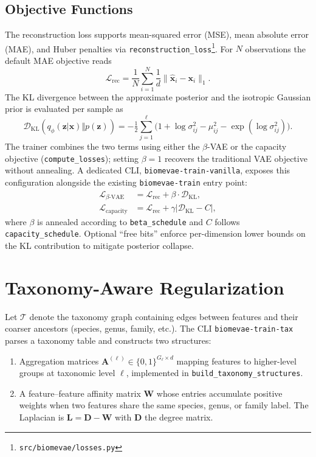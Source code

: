 \documentclass[11pt]{article}
\begin{document}
\subsection{Objective Functions}
The reconstruction loss supports mean-squared error (MSE), mean absolute error (MAE),
and Huber penalties via \texttt{reconstruction\_loss}\footnote{\texttt{src/biomevae/losses.py}}. For
$N$ observations the default MAE objective reads
\begin{equation}
    \mathcal{L}_{\mathrm{rec}} = \frac{1}{N} \sum_{i=1}^N \frac{1}{d} \lVert \hat{\bm{x}}_i - \bm{x}_i \rVert_1.
\end{equation}
The KL divergence between the approximate posterior and the isotropic Gaussian prior
is evaluated per sample as
\begin{equation}
    \mathcal{D}_{\mathrm{KL}}(q_{\phi}(\bm{z}|\bm{x}) \Vert p(\bm{z}))
    = -\tfrac{1}{2} \sum_{j=1}^{\ell} \bigl(1 + \log\sigma^2_{ij} - \mu_{ij}^2 - \exp(\log\sigma^2_{ij})\bigr).
\end{equation}
The trainer combines the two terms using either the $\beta$-VAE or the capacity
objective (\texttt{compute\_losses}); setting $\beta=1$ recovers the
traditional VAE objective without annealing. A dedicated CLI,
\texttt{biomevae-train-vanilla}, exposes this configuration alongside the
existing \texttt{biomevae-train} entry point:
\begin{align}
    \mathcal{L}_{\beta\text{-VAE}} &= \mathcal{L}_{\mathrm{rec}} + \beta \cdot \mathcal{D}_{\mathrm{KL}},\\
    \mathcal{L}_{\mathrm{capacity}} &= \mathcal{L}_{\mathrm{rec}} + \gamma \bigl\lvert \mathcal{D}_{\mathrm{KL}} - C\bigr\rvert,
\end{align}
where $\beta$ is annealed according to \texttt{beta\_schedule} and $C$ follows
\texttt{capacity\_schedule}. Optional ``free bits'' enforce per-dimension lower bounds
on the KL contribution to mitigate posterior collapse.
\section{Taxonomy-Aware Regularization}
Let $\mathcal{T}$ denote the taxonomy graph containing edges between features and their
coarser ancestors (species, genus, family, etc.). The CLI \texttt{biomevae-train-tax}
parses a taxonomy table and constructs two structures:
\begin{enumerate}[label=\roman*), leftmargin=*]
    \item Aggregation matrices $\mathbf{A}^{(\ell)} \in \{0,1\}^{G_{\ell} \times d}$ mapping features to
    higher-level groups at taxonomic level $\ell$, implemented in
    \texttt{build\_taxonomy\_structures}.
    \item A feature--feature affinity matrix $\mathbf{W}$ whose entries accumulate
    positive weights when two features share the same species, genus, or family label.
    The Laplacian is $\mathbf{L} = \mathbf{D} - \mathbf{W}$ with $\mathbf{D}$ the degree
    matrix.
\end{enumerate}
\end{document}
